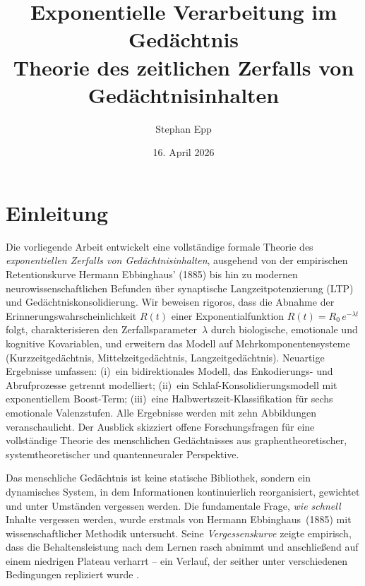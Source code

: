 ﻿\documentclass[12pt,a4paper,twoside]{article}
\title{
	{\Large\bfseries Exponentielle Verarbeitung im Gedächtnis}\\[-0.4em]
	{\large Theorie des zeitlichen Zerfalls von Gedächtnisinhalten}
}
\author{Stephan Epp}
\date{16. April 2026}
\theoremstyle{theormstyle}
\theoremstyle{proofstyle}
\begin{document}
	
	\maketitle	
	\tableofcontents
	\newpage
	
	\section{Einleitung}
	\label{sec:einleitung}
	Die vorliegende Arbeit entwickelt eine vollständige formale Theorie des
	\emph{exponentiellen Zerfalls von Gedächtnisinhalten}, ausgehend von der
	empirischen Retentionskurve Hermann Ebbinghaus' (1885) bis hin zu modernen
	neurowissenschaftlichen Befunden über synaptische Langzeitpotenzierung (LTP)
	und Gedächtniskonsolidierung. Wir beweisen rigoros, dass die Abnahme der
	Erinnerungswahrscheinlichkeit $R(t)$ einer Exponentialfunktion
	$R(t) = R_0\,e^{-\lambda t}$ folgt, charakterisieren den
	Zerfallsparameter~$\lambda$ durch biologische, emotionale und kognitive
	Kovariablen, und erweitern das Modell auf Mehrkomponentensysteme
	(Kurzzeitgedächtnis, Mittelzeitgedächtnis, Langzeitgedächtnis). Neuartige
	Ergebnisse umfassen: (i)~ein bidirektionales Modell, das Enkodierungs- und
	Abrufprozesse getrennt modelliert; (ii)~ein Schlaf-Konsolidierungsmodell mit
	exponentiellem Boost-Term; (iii)~eine Halbwertszeit-Klassifikation für sechs
	emotionale Valenzstufen. Alle Ergebnisse werden mit zehn Abbildungen
	veranschaulicht. Der Ausblick skizziert offene Forschungsfragen für eine
	vollständige Theorie des menschlichen Gedächtnisses aus graphentheoretischer,
	systemtheoretischer und quantenneuraler Perspektive.
	
	Das menschliche Gedächtnis ist keine statische Bibliothek, sondern ein dynamisches
	System, in dem Informationen kontinuierlich reorganisiert, gewichtet und
	unter Umständen vergessen werden. Die fundamentale Frage, \emph{wie schnell}
	Inhalte vergessen werden, wurde erstmals von Hermann Ebbinghaus~(1885) mit
	wissenschaftlicher Methodik untersucht. Seine \emph{Vergessenskurve} zeigte
	empirisch, dass die Behaltensleistung nach dem Lernen rasch abnimmt und
	anschließend auf einem niedrigen Plateau verharrt -- ein Verlauf, der seither
	unter verschiedenen Bedingungen repliziert wurde
	\citep{murre2015replication,wixted2004psychology}.
	
\end{document}
